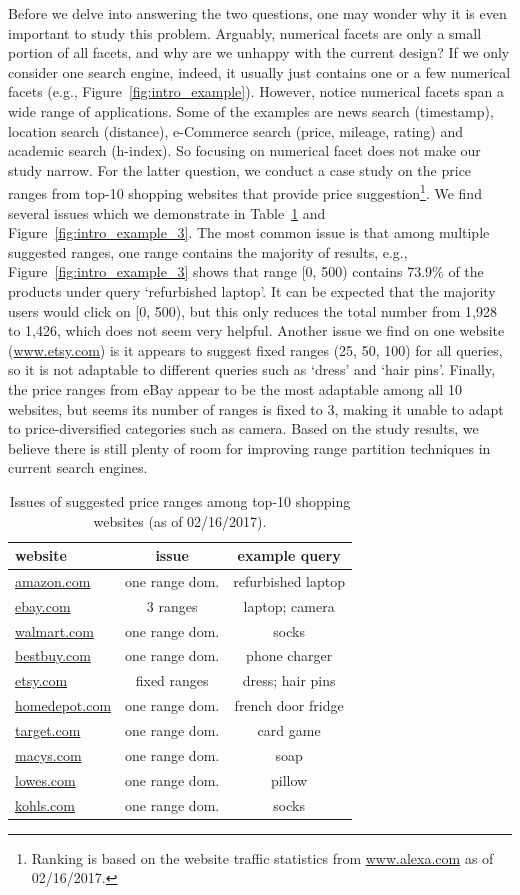 Before we delve into answering the two questions, one may wonder why it is even important to study this problem. Arguably, numerical facets are only a small portion of all facets, and why are we unhappy with the current design? If we only consider one search engine, indeed, it usually just contains one or a few numerical facets (e.g., Figure~\ref{fig:intro_example}). However, notice numerical facets span a wide range of applications. Some of the examples are news search (timestamp), location search (distance), e-Commerce search (price, mileage, rating) and academic search (h-index). So focusing on numerical facet does not make our study narrow. For the latter question, we conduct a case study on the price ranges from top-10 shopping websites that provide price suggestion\footnote{Ranking is based on the website traffic statistics from \url{www.alexa.com} as of 02/16/2017.}. We find several issues which we demonstrate in Table~\ref{tab:websites} and Figure~\ref{fig:intro_example_3}. The most common issue is that among multiple suggested ranges, one range contains the majority of results, e.g., Figure~\ref{fig:intro_example_3} shows that range [0, 500) contains 73.9\% of the products under query `refurbished laptop'. It can be expected that the majority users would click on [0, 500), but this only reduces the total number from 1,928 to 1,426, which does not seem very helpful. Another issue we find on one website (\url{www.etsy.com}) is it appears to suggest fixed ranges (25, 50, 100) for all queries, so it is not adaptable to different queries such as `dress' and `hair pins'. Finally, the price ranges from eBay appear to be the most adaptable among all 10 websites, but seems its number of ranges is fixed to 3, making it unable to adapt to price-diversified categories such as camera. Based on the study results, we believe there is still plenty of room for improving range partition techniques in current search engines. 
\begin{table}
\centering
\begin{tabular}{|l|c|c|}
\hline
website & issue & example query\\ \hline
\url{amazon.com} & one range dom. & refurbished laptop\\
\url{ebay.com} & 3 ranges & laptop; camera\\ 
\url{walmart.com} & one range dom. & socks\\ 
\url{bestbuy.com} & one range dom. & phone charger\\ 
\url{etsy.com} & fixed ranges & dress; hair pins\\ 
\url{homedepot.com} & one range dom. & french door fridge\\ 
\url{target.com} & one range dom. & card game\\ 
\url{macys.com} & one range dom. & soap\\ 
\url{lowes.com} & one range dom. & pillow\\ 
\url{kohls.com} & one range dom. & socks\\ \hline
\end{tabular}
\caption{Issues of suggested price ranges among top-10 shopping websites (as of 02/16/2017).\label{tab:websites}}
\end{table}

